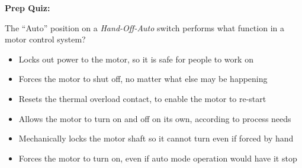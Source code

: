 \vfil \eject

\noindent
{\bf Prep Quiz:}

The ``Auto'' position on a {\it Hand-Off-Auto} switch performs what function in a motor control system?

\begin{itemize}
\item{} Locks out power to the motor, so it is safe for people to work on
\vskip 5pt 
\item{} Forces the motor to shut off, no matter what else may be happening
\vskip 5pt 
\item{} Resets the thermal overload contact, to enable the motor to re-start
\vskip 5pt 
\item{} Allows the motor to turn on and off on its own, according to process needs
\vskip 5pt 
\item{} Mechanically locks the motor shaft so it cannot turn even if forced by hand
\vskip 5pt 
\item{} Forces the motor to turn on, even if auto mode operation would have it stop
\end{itemize}



